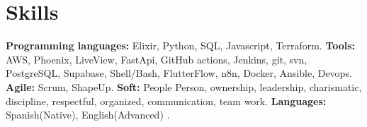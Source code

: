 \documentclass[
    changecolor={111, 156, 45}, 
]{cv-roald}
\begin{document}
\section*{Skills}
	\textbf{Programming languages:} Elixir, Python, SQL, Javascript, Terraform.
    \textbf{Tools:} AWS, Phoenix, LiveView, FastApi, GitHub actions, Jenkins, git, svn, PostgreSQL, Supabase, Shell/Bash, FlutterFlow, n8n, Docker, Ansible, Devops. \textbf{Agile:} Scrum, ShapeUp. \textbf{Soft:} People Person, ownership, leadership, charismatic, discipline, respectful, organized, communication, team work. \textbf{Languages:} Spanish(Native), English(Advanced) .

    
\end{document}
